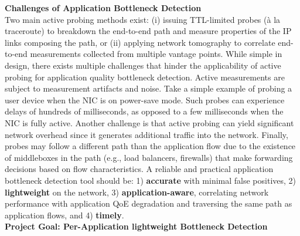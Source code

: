 \documentclass[11 pt]{article}
\begin{document}
\noindent \textbf{Challenges of Application Bottleneck Detection}\\

Two main active probing methods exist: (i) issuing TTL-limited probes (à la traceroute) to breakdown the end-to-end path and measure properties of the IP links composing the path, or (ii) applying network tomography to correlate end-to-end measurements collected from multiple vantage points. While simple in design, there exists multiple challenges that hinder the applicability of active probing for application quality bottleneck detection. Active measurements are subject to measurement artifacts and noise. Take a simple example of probing a user device when the NIC is on power-save mode. Such probes can experience delays of hundreds of milliseconds, as opposed to a few milliseconds when the NIC is fully active. Another challenge is that active probing can yield significant network overhead since it generates additional traffic into the network. Finally, probes may follow a different path than the application flow due to the existence of middleboxes in the path (e.g., load balancers, firewalls) that make forwarding decisions based on flow characteristics. A reliable and practical application bottleneck detection tool should be: 1) \textbf{accurate} with minimal false positives, 2) \textbf{lightweight} on the network, 3) \textbf{application-aware}, correlating network performance with application QoE degradation and traversing the same path as application flows, and 4) \textbf{timely}.\\
%


\noindent \textbf{Project Goal: Per-Application lightweight Bottleneck Detection}\\
\end{document}
